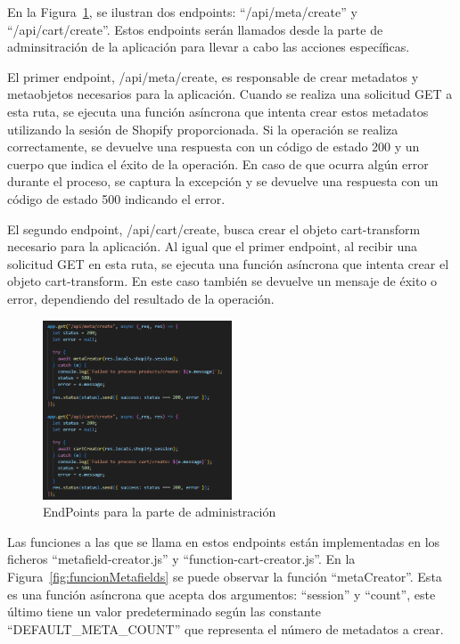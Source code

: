 \documentclass[12pt]{article}
\begin{document}
En la Figura~\ref{fig:endpointsAdmin}, se ilustran dos endpoints: ``/api/meta/create'' y ``/api/cart/create''. Estos endpoints serán
llamados desde la parte de adminsitración de la aplicación para llevar a cabo las acciones específicas.

El primer endpoint, /api/meta/create, es responsable de crear metadatos y metaobjetos necesarios para la aplicación. Cuando se realiza
una solicitud GET a esta ruta, se ejecuta una función asíncrona que intenta crear estos metadatos utilizando la sesión de Shopify proporcionada.
Si la operación se realiza correctamente, se devuelve una respuesta con un código de estado 200 y un cuerpo que indica el éxito de la operación. 
En caso de que ocurra algún error durante el proceso, se captura la excepción y se devuelve una respuesta con un código 
de estado 500 indicando el error.

El segundo endpoint, /api/cart/create, busca crear el objeto cart-transform necesario para la aplicación. Al igual que el primer endpoint, al recibir
una solicitud GET en esta ruta, se ejecuta una función asíncrona que intenta crear el objeto cart-transform. En este caso también se devuelve un 
mensaje de éxito o error, dependiendo del resultado de la operación.

\begin{figure}[ht]
    \centering
    \includegraphics[width=0.5\textwidth]{imagenes-back/EndpointsAdmin.png}
    \caption{\label{fig:endpointsAdmin} EndPoints para la parte de administración }
    \vspace{\fill}
\end{figure}

Las funciones a las que se llama en estos endpoints están implementadas en los ficheros ``metafield-creator.js'' y ``function-cart-creator.js''.
En la Figura~\ref{fig:funcionMetafields} se puede observar la función ``metaCreator''. Esta es una función asíncrona que acepta dos argumentos:
``session'' y ``count'', este último tiene un valor predeterminado según las constante ``DEFAULT\_META\_COUNT'' que representa el número de metadatos a crear.
\end{document}
